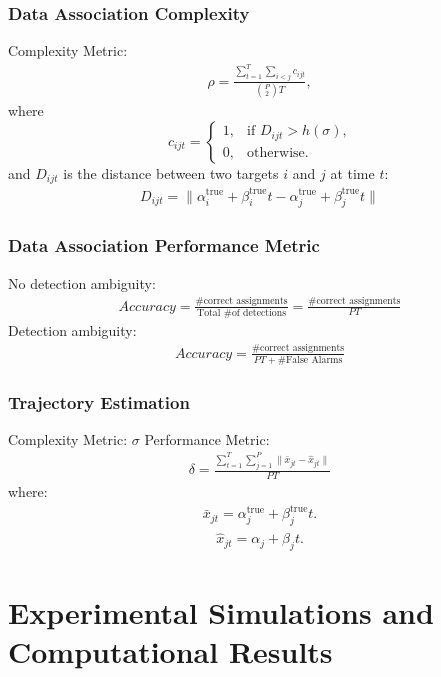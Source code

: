 \documentclass{beamer}
\begin{document}
\begin{frame}
\frametitle{Data Association Complexity} 
Complexity Metric:
\begin{align*}
\rho =  \frac{\sum\limits_{t=1}^{T}\sum\limits_{i<j}c_{ijt}}{\binom{P}{2} T},
\end{align*}
where
\[c_{ijt} = 
\begin{cases}
1, & \text{if $D_{ijt} > h(\sigma)$,}\\
0, & \text{otherwise.}
\end{cases}\]
and $D_{ijt}$ is the distance between two targets $i$ and $j$ at time $t$:
\begin{align*}
D_{ijt} = \| \alpha^{\text{true}}_{i} + \beta^{\text{true}}_{i}t - \alpha^{\text{true}}_{j} + \beta^{\text{true}}_{j}t \|
\end{align*}
\end{frame}

\begin{frame}
\frametitle{Data Association Performance Metric} 
No detection ambiguity:
\begin{align*}
Accuracy =  \frac{\text{\# correct assignments}}{\text{Total \# of detections}}= \frac{\text{\# correct assignments}}{PT}
\end{align*}
Detection ambiguity:
\begin{align*}
Accuracy =  \frac{\text{\# correct assignments}}{PT + \text{\# False Alarms}}
\end{align*}
\end{frame}

\begin{frame}
\frametitle{Trajectory Estimation} 
Complexity Metric: $\sigma$
\newline
Performance Metric:
\begin{align*}
	\delta = \frac{\sum\limits_{t=1}^{T}\sum\limits_{j=1}^{P}\| \bar{x}_{jt} - \hat{x}_{jt} \|}{PT}
\end{align*}
where:
\begin{align*}
	\bar{x}_{jt} = \alpha^{\text{true}}_{j} + \beta^{\text{true}}_{j}t.
\end{align*}
\begin{align*}
	\hat{x}_{jt} =  \alpha_{j} + \beta_{j}t.
\end{align*}
\end{frame}

\section{Experimental Simulations and Computational Results}
\end{document}
